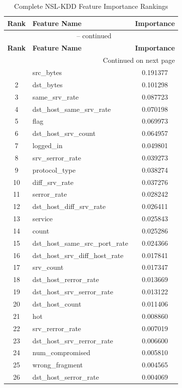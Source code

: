 \documentclass[12pt,a4paper]{report}
\begin{document}
\begin{longtable}{clc}
\caption{Complete NSL-KDD Feature Importance Rankings}
\label{tab:allfeatures}\\
\toprule
\textbf{Rank} & \textbf{Feature Name} & \textbf{Importance} \\
\midrule
\endfirsthead
\multicolumn{3}{c}{\tablename\ \thetable{} -- continued}\\
\toprule
\textbf{Rank} & \textbf{Feature Name} & \textbf{Importance} \\
\midrule
\endhead
\midrule
\multicolumn{3}{r}{Continued on next page}\\
\endfoot
\bottomrule
\endlastfoot
1 & src\_bytes & 0.191377 \\
2 & dst\_bytes & 0.101298 \\
3 & same\_srv\_rate & 0.087723 \\
4 & dst\_host\_same\_srv\_rate & 0.070198 \\
5 & flag & 0.069973 \\
6 & dst\_host\_srv\_count & 0.064957 \\
7 & logged\_in & 0.049801 \\
8 & srv\_serror\_rate & 0.039273 \\
9 & protocol\_type & 0.038274 \\
10 & diff\_srv\_rate & 0.037276 \\
11 & serror\_rate & 0.028242 \\
12 & dst\_host\_diff\_srv\_rate & 0.026411 \\
13 & service & 0.025843 \\
14 & count & 0.025286 \\
15 & dst\_host\_same\_src\_port\_rate & 0.024366 \\
16 & dst\_host\_srv\_diff\_host\_rate & 0.017841 \\
17 & srv\_count & 0.017347 \\
18 & dst\_host\_rerror\_rate & 0.013669 \\
19 & dst\_host\_srv\_serror\_rate & 0.013122 \\
20 & dst\_host\_count & 0.011406 \\
21 & hot & 0.008860 \\
22 & srv\_rerror\_rate & 0.007019 \\
23 & dst\_host\_srv\_rerror\_rate & 0.006600 \\
24 & num\_compromised & 0.005810 \\
25 & wrong\_fragment & 0.004565 \\
26 & dst\_host\_serror\_rate & 0.004069 \\

\end{longtable}
\end{document}
